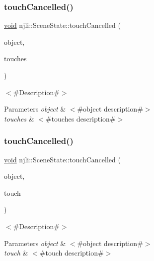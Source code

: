 \subsubsection{\texorpdfstring{touch\+Cancelled()}{touchCancelled()}\hspace{0.1cm}{\footnotesize\ttfamily [1/2]}}
{\footnotesize\ttfamily \mbox{\hyperlink{_thread_8h_af1e856da2e658414cb2456cb6f7ebc66}{void}} njli\+::\+Scene\+State\+::touch\+Cancelled (\begin{DoxyParamCaption}\item[{\mbox{\hyperlink{classnjli_1_1_scene}{Scene}} $\ast$}]{object,  }\item[{\mbox{\hyperlink{classnjli_1_1_device_touch}{Device\+Touch}} $\ast$$\ast$}]{touches }\end{DoxyParamCaption})}

$<$\#\+Description\#$>$


\begin{DoxyParams}{Parameters}
{\em object} & $<$\#object description\#$>$ \\
\hline
{\em touches} & $<$\#touches description\#$>$ \\
\hline
\end{DoxyParams}
\mbox{\label{classnjli_1_1_scene_state_abda337709547b3fd1cc5ea03632299ce}} 
\subsubsection{\texorpdfstring{touch\+Cancelled()}{touchCancelled()}\hspace{0.1cm}{\footnotesize\ttfamily [2/2]}}
{\footnotesize\ttfamily \mbox{\hyperlink{_thread_8h_af1e856da2e658414cb2456cb6f7ebc66}{void}} njli\+::\+Scene\+State\+::touch\+Cancelled (\begin{DoxyParamCaption}\item[{\mbox{\hyperlink{classnjli_1_1_scene}{Scene}} $\ast$}]{object,  }\item[{const \mbox{\hyperlink{classnjli_1_1_device_touch}{Device\+Touch}} \&}]{touch }\end{DoxyParamCaption})}

$<$\#\+Description\#$>$


\begin{DoxyParams}{Parameters}
{\em object} & $<$\#object description\#$>$ \\
\hline
{\em touch} & $<$\#touch description\#$>$ \\
\hline
\end{DoxyParams}
\mbox{\label{classnjli_1_1_scene_state_aada7738b0ccc928bc8f258de1f046738}} 
